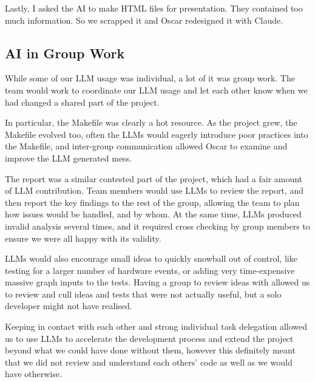 Lastly, I asked the AI to make HTML files for presentation. They contained too
much information. So we scrapped it and Oscar redesigned it with Claude.

\subsection{AI in Group Work}

While some of our LLM usage was individual, a lot of it was group work. The team
would work to coordinate our LLM usage and let each other know when we had
changed a shared part of the project.

In particular, the Makefile was clearly a hot resource. As the project grew, the
Makefile evolved too, often the LLMs would eagerly introduce poor practices into
the Makefile, and inter-group communication allowed Oscar to examine and improve
the LLM generated mess.

The report was a similar contested part of the project, which had a fair amount
of LLM contribution. Team members would use LLMs to review the report, and then
report the key findings to the rest of the group, allowing the team to plan how
issues would be handled, and by whom. At the same time, LLMs produced invalid
analysis several times, and it required cross checking by group members to
ensure we were all happy with its validity.

LLMs would also encourage small ideas to quickly snowball out of control, like
testing for a larger number of hardware events, or adding very time-expensive
massive graph inputs to the tests. Having a group to review ideas with allowed
us to review and cull ideas and tests that were not actually useful, but a solo
developer might not have realised.

Keeping in contact with each other and strong individual task delegation allowed
us to use LLMs to accelerate the development process and extend the project
beyond what we could have done without them, however this definitely meant that
we did not review and understand each others' code as well as we would have
otherwise.
